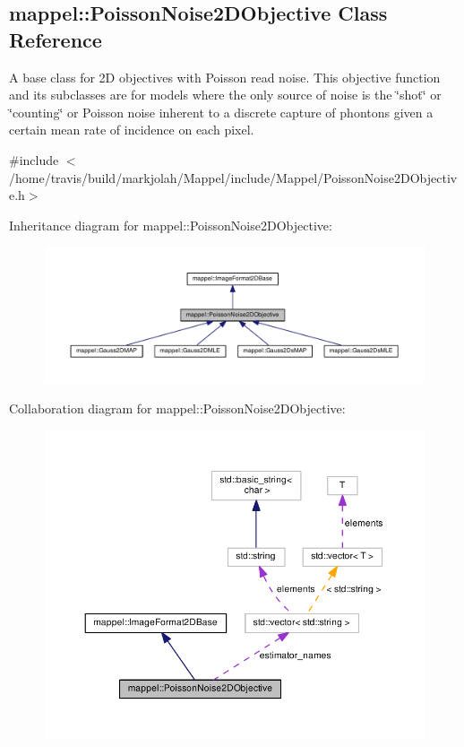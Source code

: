\hypertarget{classmappel_1_1PoissonNoise2DObjective}{}\subsection{mappel\+:\+:Poisson\+Noise2\+D\+Objective Class Reference}
\label{classmappel_1_1PoissonNoise2DObjective}


A base class for 2D objectives with Poisson read noise. This objective function and its subclasses are for models where the only source of noise is the \char`\"{}shot\char`\"{} or \char`\"{}counting\char`\"{} or Poisson noise inherent to a discrete capture of phontons given a certain mean rate of incidence on each pixel.  




{\ttfamily \#include $<$/home/travis/build/markjolah/\+Mappel/include/\+Mappel/\+Poisson\+Noise2\+D\+Objective.\+h$>$}



Inheritance diagram for mappel\+:\+:Poisson\+Noise2\+D\+Objective\+:\nopagebreak
\begin{figure}[H]
\begin{center}
\leavevmode
\includegraphics[width=350pt]{classmappel_1_1PoissonNoise2DObjective__inherit__graph}
\end{center}
\end{figure}


Collaboration diagram for mappel\+:\+:Poisson\+Noise2\+D\+Objective\+:\nopagebreak
\begin{figure}[H]
\begin{center}
\leavevmode
\includegraphics[width=350pt]{classmappel_1_1PoissonNoise2DObjective__coll__graph}
\end{center}
\end{figure}
